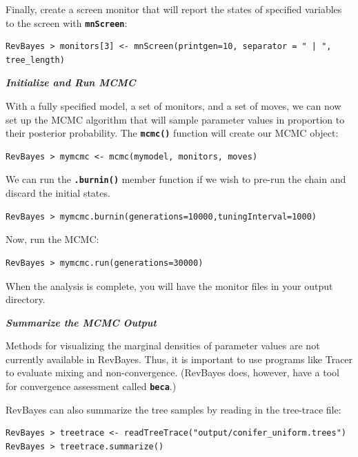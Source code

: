 \documentclass[11pt]{article}
\newcommand{\cl}[1]{{\texttt{\textbf{#1}}}}
\begin{document}
Finally, create a screen monitor that will report the states of specified variables to the screen with \cl{mnScreen}:
{\tt \begin{snugshade*}
\begin{lstlisting}
RevBayes > monitors[3] <- mnScreen(printgen=10, separator = " | ", tree_length)
\end{lstlisting}
\end{snugshade*}}

\textbf{\textit{Initialize and Run MCMC}}

With a fully specified model, a set of monitors, and a set of moves, we can now set up the MCMC algorithm that will sample parameter values in proportion to their posterior probability. The \cl{mcmc()} function will create our MCMC object:
{\tt \begin{snugshade*}
\begin{lstlisting}
RevBayes > mymcmc <- mcmc(mymodel, monitors, moves)
\end{lstlisting}
\end{snugshade*}}


We can run the \cl{.burnin()} member function if we wish to pre-run the chain and discard the initial states. 
{\tt \begin{snugshade*}
\begin{lstlisting}
RevBayes > mymcmc.burnin(generations=10000,tuningInterval=1000)
\end{lstlisting}
\end{snugshade*}}


Now, run the MCMC:
{\tt \begin{snugshade*}
\begin{lstlisting}
RevBayes > mymcmc.run(generations=30000)
\end{lstlisting}
\end{snugshade*}}

When the analysis is complete, you will have the monitor files in your output directory.


\textbf{\textit{Summarize the MCMC Output}}

Methods for visualizing the marginal densities of parameter values are not currently available in RevBayes. Thus, it is important to use programs like Tracer \citep{rambaut09} to evaluate mixing and non-convergence. (RevBayes does, however, have a tool for convergence assessment called \cl{beca}.)

RevBayes can also summarize the tree samples by reading in the tree-trace file:
{\tt \begin{snugshade*}
\begin{lstlisting}
RevBayes > treetrace <- readTreeTrace("output/conifer_uniform.trees")
RevBayes > treetrace.summarize()
\end{lstlisting}
\end{snugshade*}}
\end{document}
